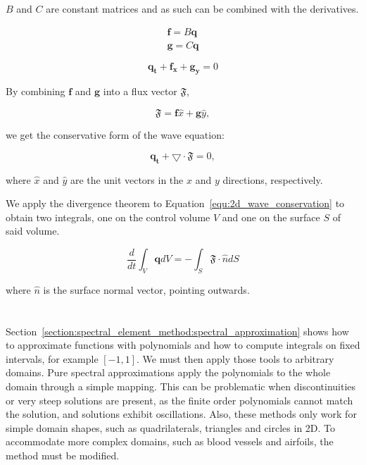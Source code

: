 \(B\) and \(C\) are constant matrices and as such can be combined with the derivatives.

\begin{gather}
    \mathbf{f} = B \mathbf{q} \\
    \mathbf{g} = C \mathbf{q}
\end{gather}

\begin{equation}
    \mathbf{q_t} + \mathbf{f_x} + \mathbf{g_y} = 0
\end{equation}

By combining \(\mathbf{f}\) and \(\mathbf{g}\) into a flux vector \(\mathfrak{F}\), 

\begin{equation} \label{equ:2d_wave_fluxes}
    \mathfrak{F} = \mathbf{f}\widehat{x} + \mathbf{g}\widehat{y},
\end{equation}

\noindent
we get the conservative form of the wave equation:

\begin{equation} \label{equ:2d_wave_conservation}
    \mathbf{q_t} + \bigtriangledown \cdot \mathfrak{F} = 0,
\end{equation}

\noindent
where \(\widehat{x}\) and \(\widehat{y}\) are the unit vectors in the \(x\) and \(y\) directions,
respectively. 

We apply the divergence theorem to Equation~\ref{equ:2d_wave_conservation} to obtain two integrals,
one on the control volume \(V\) and one on the surface \(S\) of said volume.

\begin{equation} \label{equ:2d_wave_integral}
    \frac{d}{dt}\int_{V}\mathbf{q}dV = -\int_{S} \mathfrak{F} \cdot \widehat{n}dS
\end{equation}

\noindent
where \(\widehat{n}\) is the surface normal vector, pointing outwards.

\section{}\label{section:spectral_element_method:dg_sem}

Section~\ref{section:spectral_element_method:spectral_approximation} shows how to approximate
functions with polynomials and how to compute integrals on fixed intervals, for example \(\left[ -1,
1 \right]\). We must then apply those tools to arbitrary domains. Pure spectral approximations apply
the polynomials to the whole domain through a simple mapping. This can be problematic when
discontinuities or very steep solutions are present, as the finite order polynomials cannot match
the solution, and solutions exhibit oscillations. Also, these methods only work for simple domain
shapes, such as quadrilaterals, triangles and circles in 2D. To accommodate more complex domains,
such as blood vessels and airfoils, the method must be modified.

